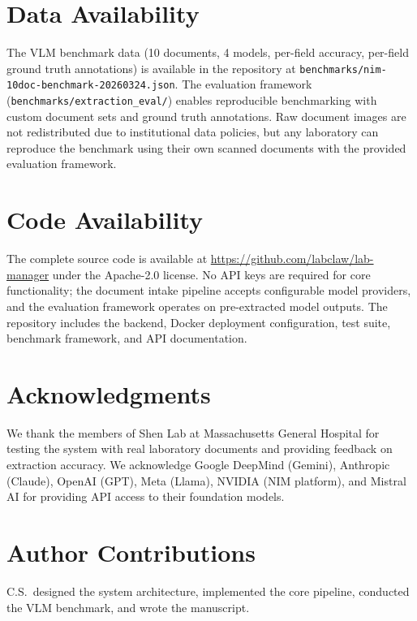 \documentclass[11pt]{article}
\begin{document}
\section{Data Availability}
The VLM benchmark data (10 documents, 4 models, per-field accuracy,
per-field ground truth annotations) is available in the repository at
\texttt{benchmarks/nim-10doc-benchmark-20260324.json}. The evaluation
framework (\texttt{benchmarks/extraction\_eval/}) enables reproducible
benchmarking with custom document sets and ground truth annotations.
Raw document images are not redistributed due to institutional data
policies, but any laboratory can reproduce the benchmark using their own
scanned documents with the provided evaluation framework.

\section{Code Availability}
The complete source code is available at
\url{https://github.com/labclaw/lab-manager} under the Apache-2.0
license. No API keys are required for core functionality; the document
intake pipeline accepts configurable model providers, and the
evaluation framework operates on pre-extracted model outputs. The
repository includes the backend, Docker deployment configuration, test
suite, benchmark framework, and API documentation.

\section{Acknowledgments}
We thank the members of Shen Lab at Massachusetts General Hospital
for testing the system with real laboratory documents and providing
feedback on extraction accuracy. We acknowledge Google DeepMind
(Gemini), Anthropic (Claude), OpenAI (GPT), Meta (Llama), NVIDIA
(NIM platform), and Mistral AI for providing API access to their
foundation models.

\section{Author Contributions}
C.S.\ designed the system architecture, implemented the core pipeline,
conducted the VLM benchmark, and wrote the manuscript.

\end{document}
